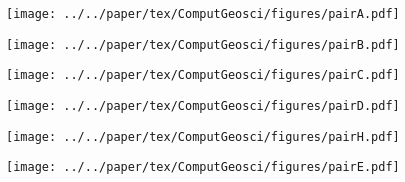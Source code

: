 \begin{figure*}[!ht]
  \captionsetup[subfigure]{singlelinecheck=off,justification=raggedright,aboveskip=-6pt,belowskip=-6pt}
  \centering
  \begin{subfigure}[htbp]{.495\textwidth}
    \centering
    \caption{}\label{fig:2traj1}
    \texttt{[image: ../../paper/tex/ComputGeosci/figures/pairA.pdf]}
  \end{subfigure}
  \vspace{.5em}
  \begin{subfigure}[htbp]{.495\textwidth}
    \centering
    \caption{}\label{fig:2traj2}
    \texttt{[image: ../../paper/tex/ComputGeosci/figures/pairB.pdf]}
  \end{subfigure}
  \begin{subfigure}[htbp]{.495\textwidth}
    \centering
    \caption{}\label{fig:2traj3}
    \texttt{[image: ../../paper/tex/ComputGeosci/figures/pairC.pdf]}
  \end{subfigure}
  \vspace{.5em}
  \begin{subfigure}[htbp]{.495\textwidth}
    \centering
    \caption{}\label{fig:2traj4}
    \texttt{[image: ../../paper/tex/ComputGeosci/figures/pairD.pdf]}
  \end{subfigure}
  \begin{subfigure}[htbp]{.495\textwidth}
    \centering
    \caption{}\label{fig:2traj5}
    \texttt{[image: ../../paper/tex/ComputGeosci/figures/pairH.pdf]}
  \end{subfigure}
  \vspace{.5em}
  \begin{subfigure}[htbp]{.495\textwidth}
    \centering
    \caption{}\label{fig:2traj6}
    \texttt{[image: ../../paper/tex/ComputGeosci/figures/pairE.pdf]}
  \end{subfigure}
\end{figure*}%
